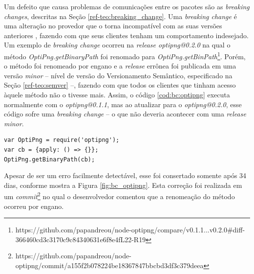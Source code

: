 Um defeito que causa problemas de comunicações entre os pacotes são as \textit{breaking changes}, descritas na Seção \ref{ref-teo:breaking_change}. Uma \textit{breaking change} é uma alteração no provedor que o torna incompatível com as suas versões anteriores \cite{intro:break_change}, fazendo com que seus clientes tenham um comportamento indesejado. Um exemplo de \textit{breaking change} ocorreu na \textit{release optipng@0.2.0} na qual o método \textit{OptiPng.getBinaryPath} foi renomado para \textit{OptiPng.getBinPath}\footnote{https://github.com/papandreou/node-optipng/compare/v0.1.1...v0.2.0\#diff-366460cd3c3170c9c84340631e6f8e4fL22-R19}. Porém, o método foi renomeado por engano e a \textit{release} errônea foi publicada em uma versão \textit{minor} -- nível de versão do Versionamento Semântico, especificado na Seção \ref{ref-teo:semver} --, fazendo com que todos os clientes que tinham acesso àquele método não o tivesse mais. Assim, o código \ref{cod:bc:optipng} executa normalmente com o \textit{optipng@0.1.1}, mas ao atualizar para o \textit{optipng@0.2.0}, esse código sofre uma \textit{breaking change} -- o que não deveria acontecer com uma \textit{release minor}.

\begin{lstlisting}[style=Javascript, label=cod:bc:optipng, caption={Código que sofre \textit{breaking change} do \textit{optipng}}]
var OptiPng = require('optipng');
var cb = {apply: () => {}};
OptiPng.getBinaryPath(cb);
\end{lstlisting}

Apesar de ser um erro facilmente detectável, esse foi consertado somente após 34 dias, conforme mostra a Figura \ref{fig:bc_optipng}. Esta correção foi realizada em um \textit{commit}\footnote{https://github.com/papandreou/node-optipng/commit/a155f2b078224be18367847bbcbd3df3c379deea} no qual o desenvolvedor comentou que a renomeação do método ocorreu por engano.

